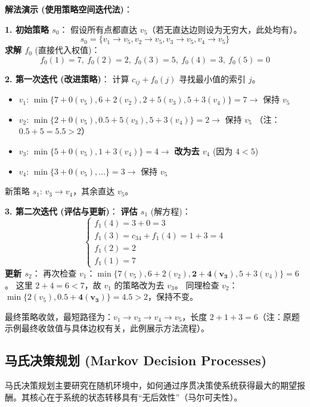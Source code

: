 \documentclass[a4paper,12pt]{ctexart} %
\begin{document}
	\textbf{解法演示 (使用策略空间迭代法)}：
	
	\textbf{1. 初始策略 $s_0$}：
	假设所有点都直达 $v_5$（若无直达边则设为无穷大，此处均有）。
	\[ s_0 = \{ v_1 \to v_5, v_2 \to v_5, v_3 \to v_5, v_4 \to v_5 \} \]
	\textbf{求解 $f_0$} (直接代入权值)：
	\[ f_0(1)=7, \ f_0(2)=2, \ f_0(3)=5, \ f_0(4)=3, \ f_0(5)=0 \]
	
	\textbf{2. 第一次迭代 (改进策略)}：
	计算 $c_{ij} + f_0(j)$ 寻找最小值的索引 $j$。
	\begin{itemize}
		\item $v_1$: $\min \{ 7+0(v_5), 6+2(v_2), 2+5(v_3), 5+3(v_4) \} = 7 \to$ 保持 $v_5$
		\item $v_2$: $\min \{ 2+0(v_5), 0.5+5(v_3), 5+3(v_4) \} = 2 \to$ 保持 $v_5$ （注：$0.5+5=5.5 > 2$）
		\item $v_3$: $\min \{ 5+0(v_5), 1+3(v_4) \} = 4 \to$ \textbf{改为去 $v_4$} (因为 $4 < 5$)
		\item $v_4$: $\min \{ 3+0(v_5), \dots \} = 3 \to$ 保持 $v_5$
	\end{itemize}
	新策略 $s_1$: $v_3 \to v_4$，其余直达 $v_5$。
	
	\textbf{3. 第二次迭代 (评估与更新)}：
	\textbf{评估 $s_1$} (解方程)：
	\[
	\begin{cases}
		f_1(4) = 3 + 0 = 3 \\
		f_1(3) = c_{34} + f_1(4) = 1 + 3 = 4 \\
		f_1(2) = 2 \\
		f_1(1) = 7
	\end{cases}
	\]
	\textbf{更新 $s_2$}：
	再次检查 $v_1$：$\min \{ 7(v_5), 6+2(v_2), \mathbf{2+4(v_3)}, 5+3(v_4) \} = 6$。
	这里 $2+4=6 < 7$，故 $v_1$ 的策略改为去 $v_3$。
	同理检查 $v_2$：$\min \{ 2(v_5), \mathbf{0.5+4(v_3)} \} = 4.5 > 2$，保持不变。
	
	最终策略收敛，最短路径为：$v_1 \to v_3 \to v_4 \to v_5$，长度 $2+1+3=6$（注：原题示例最终收敛值与具体边权有关，此例展示方法流程）。
	
	\subsection{马氏决策规划 (Markov Decision Processes)}
	
	马氏决策规划主要研究在随机环境中，如何通过序贯决策使系统获得最大的期望报酬。其核心在于系统的状态转移具有“无后效性”（马尔可夫性）。
	
\end{document}
